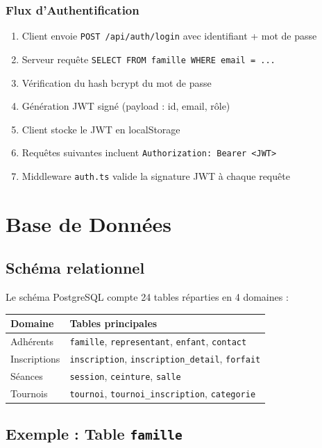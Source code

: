\documentclass[11pt,a4paper]{article}
\begin{document}
\subsubsection{Flux d'Authentification}
\begin{enumerate}
  \item Client envoie \texttt{POST /api/auth/login} avec identifiant + mot de passe
  \item Serveur requête \texttt{SELECT FROM famille WHERE email = ...}
  \item Vérification du hash bcrypt du mot de passe
  \item Génération JWT signé (payload : id, email, rôle)
  \item Client stocke le JWT en localStorage
  \item Requêtes suivantes incluent \texttt{Authorization: Bearer <JWT>}
  \item Middleware \texttt{auth.ts} valide la signature JWT à chaque requête
\end{enumerate}

\section{Base de Données}

\subsection{Schéma relationnel}

Le schéma PostgreSQL compte 24 tables réparties en 4 domaines :

\begin{tabular}{lp{7cm}}
\toprule
\textbf{Domaine} & \textbf{Tables principales} \\
\midrule
Adhérents & \texttt{famille}, \texttt{representant}, \texttt{enfant}, \texttt{contact} \\
Inscriptions & \texttt{inscription}, \texttt{inscription\_detail}, \texttt{forfait} \\
Séances & \texttt{session}, \texttt{ceinture}, \texttt{salle} \\
Tournois & \texttt{tournoi}, \texttt{tournoi\_inscription}, \texttt{categorie} \\
\bottomrule
\end{tabular}

\subsection{Exemple : Table \texttt{famille}}
\end{document}
